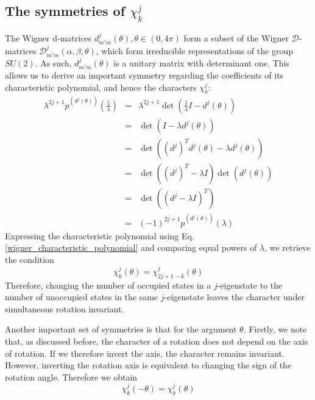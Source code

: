 \documentclass[12pt]{article}
\begin{document}
	\subsection{The symmetries of $\chi^j_k$}
	The Wigner d-matrices $d^j_{m'm}(\theta), \theta\in (0,4\pi)$ form a subset of the Wigner $\mathcal{D}$-matrices $\mathcal{D}^j_{m'm}(\alpha, \beta, \theta)$, which form irreducible representations of the group $SU(2)$. As such, $d^j_{m'm}(\theta)$ is a unitary matrix with determinant one. This allows us to derive an important symmetry regarding the coefficients of its characteristic polynomial, and hence the characters $\chi^j_k$:
	\begin{eqnarray}
	\lambda^{2j+1}p^{\left(d^j(\theta)\right)}\left(\frac{1}{\lambda}\right) &=& \lambda^{2j+1}\det(\frac{1}{\lambda}I-d^j(\theta))\\
	&=& \det(I-\lambda d^j(\theta))\\
	&=& \det(\left(d^j\right)^Td^j(\theta)-\lambda d^j(\theta))\\
	&=& \det(\left(d^j\right)^T-\lambda I)\det(d^j(\theta))\\
	&=& \det(\left(d^j-\lambda I\right)^T)\\
	&=& (-1)^{2j+1}p^{\left(d^j(\theta)\right)}(\lambda)
	\end{eqnarray}
	Expressing the characteristic polynomial using Eq. \ref{wigner_characteristic_polynomial} and comparing equal powers of $\lambda$, we retrieve the condition
	\begin{equation}
	\chi^j_k(\theta)=\chi^j_{2j+1-k}(\theta)
	\end{equation}
	Therefore, changing the number of occupied states in a $j$-eigenstate to the number of unoccupied states in the same $j$-eigenstate leaves the character under simultaneous rotation invariant.
	
	Another important set of symmetries is that for the argument $\theta$. Firstly, we note that, as discussed before, the character of a rotation does not depend on the axis of rotation. If we therefore invert the axis, the character remains invariant. However, inverting the rotation axis is equivalent to changing the sign of the rotation angle. Therefore we obtain
	\begin{equation} \label{flip_angle_sign}
	\chi^j_k(-\theta)=\chi^j_k(\theta)
	\end{equation}
	
\end{document}
